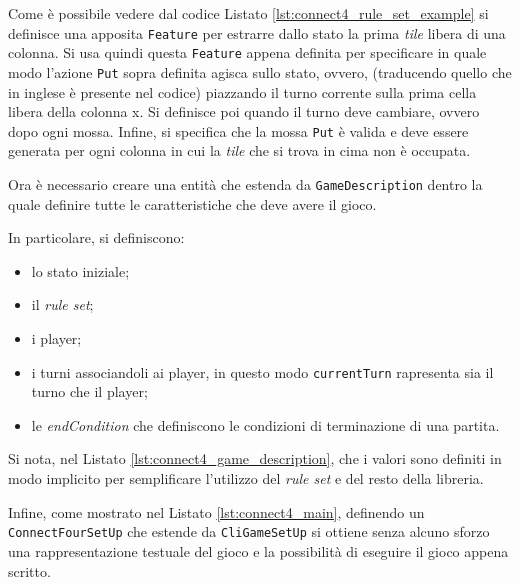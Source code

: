 

%
Come è possibile vedere dal codice Listato \ref{lst:connect4_rule_set_example} si definisce una apposita \texttt{Feature} per estrarre dallo stato la prima \textit{tile} libera di una colonna.
%
Si usa quindi questa \texttt{Feature} appena definita per specificare in quale modo l'azione \texttt{Put} sopra definita agisca sullo stato, ovvero, (traducendo quello che in inglese è presente nel codice) piazzando il turno corrente sulla prima cella libera della colonna x.
%
Si definisce poi quando il turno deve cambiare, ovvero dopo ogni mossa.
%
Infine, si specifica che la mossa \texttt{Put} è valida e deve essere generata per ogni colonna in cui la \textit{tile} che si trova in cima non è occupata.

Ora è necessario creare una entità che estenda da \texttt{GameDescription} dentro la quale definire tutte le caratteristiche che deve avere il gioco.
%

%
In particolare, si definiscono:
\begin{itemize}
  \item lo stato iniziale;
  \item il \textit{rule set};
  \item i player;
  \item i turni associandoli ai player, in questo modo \texttt{currentTurn} rapresenta sia il turno che il player;
  \item le \textit{endCondition} che definiscono le condizioni di terminazione di una partita.
\end{itemize}
%
Si nota, nel Listato \ref{lst:connect4_game_description}, che i valori sono definiti in modo implicito per semplificare l'utilizzo del \textit{rule set} e del resto della libreria.


%
Infine, come mostrato nel Listato \ref{lst:connect4_main}, definendo un \texttt{ConnectFourSetUp} che estende da \texttt{CliGameSetUp} si ottiene senza alcuno sforzo una rappresentazione testuale del gioco e la possibilità di eseguire il gioco appena scritto.


